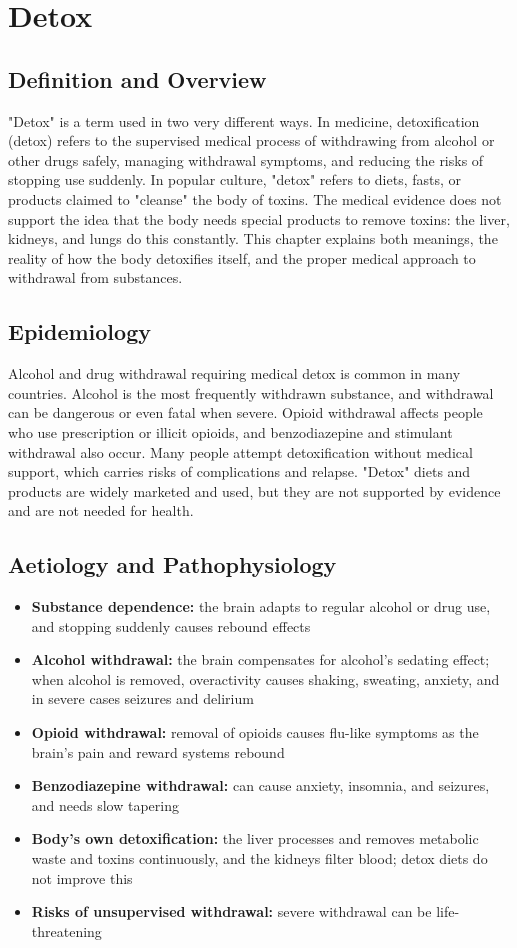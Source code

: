 \chapter{Detox}

\section*{Definition and Overview}
"Detox" is a term used in two very different ways. In medicine, detoxification (detox) refers to the supervised medical process of withdrawing from alcohol or other drugs safely, managing withdrawal symptoms, and reducing the risks of stopping use suddenly. In popular culture, "detox" refers to diets, fasts, or products claimed to "cleanse" the body of toxins. The medical evidence does not support the idea that the body needs special products to remove toxins: the liver, kidneys, and lungs do this constantly. This chapter explains both meanings, the reality of how the body detoxifies itself, and the proper medical approach to withdrawal from substances.

\section*{Epidemiology}
Alcohol and drug withdrawal requiring medical detox is common in many countries. Alcohol is the most frequently withdrawn substance, and withdrawal can be dangerous or even fatal when severe. Opioid withdrawal affects people who use prescription or illicit opioids, and benzodiazepine and stimulant withdrawal also occur. Many people attempt detoxification without medical support, which carries risks of complications and relapse. "Detox" diets and products are widely marketed and used, but they are not supported by evidence and are not needed for health.

\section*{Aetiology and Pathophysiology}
\begin{itemize}
    \item \textbf{Substance dependence:} the brain adapts to regular alcohol or drug use, and stopping suddenly causes rebound effects
    \item \textbf{Alcohol withdrawal:} the brain compensates for alcohol's sedating effect; when alcohol is removed, overactivity causes shaking, sweating, anxiety, and in severe cases seizures and delirium
    \item \textbf{Opioid withdrawal:} removal of opioids causes flu-like symptoms as the brain's pain and reward systems rebound
    \item \textbf{Benzodiazepine withdrawal:} can cause anxiety, insomnia, and seizures, and needs slow tapering
    \item \textbf{Body's own detoxification:} the liver processes and removes metabolic waste and toxins continuously, and the kidneys filter blood; detox diets do not improve this
    \item \textbf{Risks of unsupervised withdrawal:} severe withdrawal can be life-threatening
\end{itemize}

